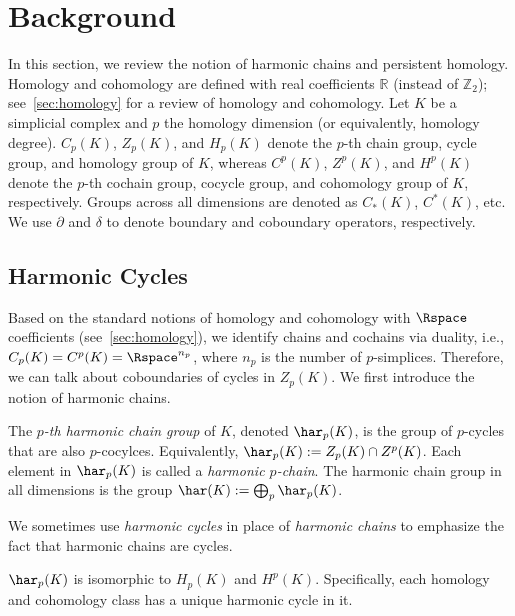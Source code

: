 \section{Background}
\label{sec:background}

In this section, we review the notion of harmonic chains and persistent homology. 
Homology and cohomology are defined with  real coefficients $\mathbb{R}$ (instead of $\mathbb{Z}_2$);
see~\cref{sec:homology} for a review of 
homology and cohomology.
Let $K$ be a simplicial complex and $p$ the homology dimension (or equivalently, homology degree). 
$C_p(K)$, $Z_p(K)$, and $H_p(K)$ denote the $p$-th chain group, cycle group, and homology group of $K$, whereas $C^p(K)$, $Z^p(K)$, and $H^p(K)$ denote the $p$-th cochain group, cocycle group, and cohomology group of $K$, respectively.
Groups across all dimensions are denoted as $C_*(K)$, $C^*(K)$, etc. 
We use $\partial$ and $\delta$ to denote boundary and coboundary operators, respectively. 

\subsection{Harmonic Cycles} 
Based on the standard notions of homology and cohomology  with $\Rspace$ coefficients (see~\cref{sec:homology}), we identify chains and cochains via duality, i.e.,~$C_p(K)= C^p(K)=\Rspace^{n_p}$, where $n_p$ is the number of $p$-simplices. 
Therefore, we can talk about coboundaries of cycles in $Z_p(K)$. 
We first introduce the notion of harmonic chains.  
\begin{definition}
\label{def:harmonic-cycle}
The \emph{$p$-th harmonic chain group} of $K$, denoted $\har_p(K)$, is the group of $p$-cycles that are also $p$-cocylces. 
Equivalently, $\har_p(K) := Z_p(K)\cap Z^p(K)$.
Each element in $\har_p(K)$ is called a \emph{harmonic $p$-chain}.
The harmonic chain group in all dimensions is the group $\har(K):=\bigoplus_p \har_p(K)$.
\end{definition}
We sometimes use \emph{harmonic cycles} in place of \emph{harmonic chains} to emphasize the fact that harmonic chains are cycles.

\begin{lemma}
\label{lem:har-homo-iso}
$\har_p(K)$ is isomorphic to $H_p(K)$ and $H^p(K)$. Specifically, each homology and cohomology class has a unique harmonic cycle in it.
\end{lemma}


